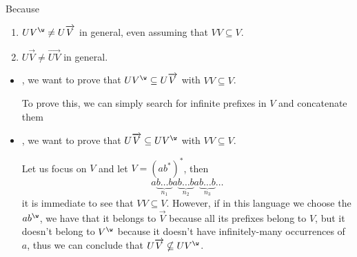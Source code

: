 \documentclass[oneside]{academica}
\begin{document}
\begin{question*}
  Because
  \begin{enumerate}
    \item $U V^\w \neq U \overrightarrow{V}$ in general, even assuming that $V V \subseteq V$.
    \item $U \overrightarrow{V} \neq \overrightarrow{UV}$ in general.
  \end{enumerate}
\end{question*}

\begin{proof*}[1]
  \begin{itemize}
    \item[\color{pink!200}$\Rightarrow$] \ie, we want to prove that $U V^\w \subseteq U \overrightarrow{V}$ with $V V \subseteq V$.

      To prove this, we can simply search for infinite prefixes in $V$ and concatenate them
      \begin{center}
        
      \end{center}
    \item[\color{pink!200}$\Leftarrow$] \ie, we want to prove that $U \overrightarrow{V} \subseteq U V^\w$ with $V V \subseteq V$.

      Let us focus on $V$ and let $V=(ab^*)^*$, then
      \begin{equation*}
        a\underbrace{b \ldots b}_{n_1}a\underbrace{b \ldots b}_{n_2}a\underbrace{b \ldots b}_{n_3}\ldots
      \end{equation*}
      it is immediate to see that $V V \subseteq V$.
      However, if in this language we choose the \wword $ab^\w$, we have that it belongs to $\overrightarrow{V}$ because all its prefixes belong to $V$, but it doesn't belong to $V^\w$ because it doesn't have infinitely-many occurrences of $a$, thus we can conclude that $U \overrightarrow{V} \nsubseteq U V^\w$.
  \end{itemize}
\end{proof*}
\end{document}
